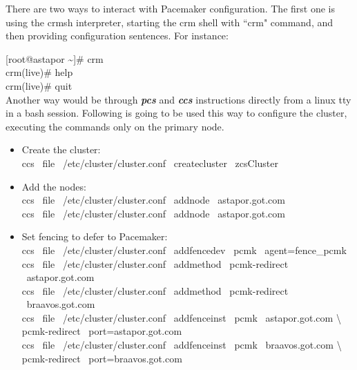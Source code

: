 \documentclass[a4paper, 12pt]{book}
\begin{document}
\noindent There are two ways to interact with Pacemaker configuration. The first one is using the crmsh interpreter, starting the crm shell with ``crm" command, and then providing configuration sentences. For instance:\bigskip

	[root@astapor \textasciitilde]\# crm\\
	\indent crm(live)\# help\\
	\indent crm(live)\# quit\\

\noindent Another way would be through \textit{\textbf{pcs}} and \textit{\textbf{ccs}} instructions directly from a linux tty in a bash session. Following is going to be used this way to configure the cluster, executing the commands only on the primary node.

\begin{itemize}
	\item Create the cluster:\\
		ccs \ \textminus \textminus file \ /etc/cluster/cluster.conf \ \textminus \textminus createcluster \ zcsCluster
\end{itemize}

\begin{itemize}
	\item Add the nodes:\\
		ccs \ \textminus \textminus file \ /etc/cluster/cluster.conf \ \textminus \textminus addnode \ astapor.got.com\\
		ccs \ \textminus \textminus file \ /etc/cluster/cluster.conf \ \textminus \textminus addnode \ astapor.got.com
\end{itemize}

\begin{itemize}
	\item Set fencing to defer to Pacemaker:\\
		ccs \ \textminus \textminus file \ /etc/cluster/cluster.conf \ \textminus \textminus addfencedev \ pcmk \ agent=fence\_pcmk\\
		ccs \ \textminus \textminus file \ /etc/cluster/cluster.conf \ \textminus \textminus addmethod \ pcmk-redirect \ astapor.got.com\\
		ccs \ \textminus \textminus file \ /etc/cluster/cluster.conf \ \textminus \textminus addmethod \ pcmk-redirect \ braavos.got.com\\
		ccs \ \textminus \textminus file \ /etc/cluster/cluster.conf \ \textminus \textminus addfenceinst \ pcmk \ astapor.got.com \textbackslash \\ pcmk-redirect \ port=astapor.got.com\\
		ccs \ \textminus \textminus file \ /etc/cluster/cluster.conf \ \textminus \textminus addfenceinst \ pcmk \ braavos.got.com \textbackslash \\ pcmk-redirect \ port=braavos.got.com
\end{itemize}
\end{document}
